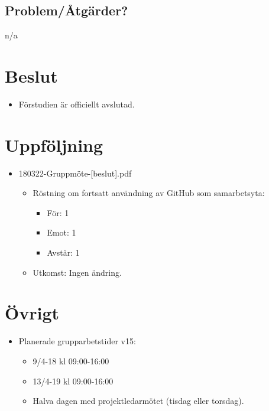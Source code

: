 \subsection*{Problem/Åtgärder?}
n/a

\section*{Beslut}
\begin{itemize}
    \item Förstudien är officiellt avslutad.
\end{itemize}

\section*{Uppföljning}
\begin{itemize}[noitemsep]
    \item 180322-Gruppmöte-[beslut].pdf
    \begin{itemize}[noitemsep]
        \item Röstning om fortsatt användning av GitHub som samarbetsyta:
        \begin{itemize}[noitemsep]
            \item För: 1
            \item Emot: 1
            \item Avstår: 1
        \end{itemize}
        \item Utkomst: Ingen ändring.
    \end{itemize}
\end{itemize}

\section*{Övrigt}

\begin{itemize}[noitemsep]
    \item Planerade grupparbetstider v15:
    \begin{itemize}[noitemsep]
        \item 9/4-18 kl 09:00-16:00
        \item 13/4-19 kl 09:00-16:00
        \item Halva dagen med projektledarmötet (tisdag eller torsdag).
    \end{itemize}
\end{itemize}